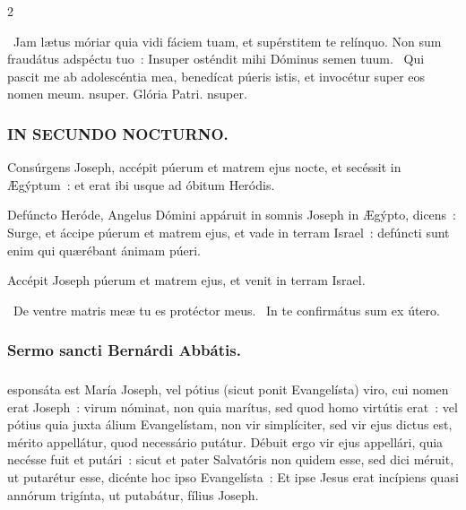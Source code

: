\documentclass[9pt,twoside]{extarticle}
\begin{document}
\begin{multicols}{2}
{\begin{tightlist}{}
\item {}~Jam lætus móriar quia vidi fáciem tuam, et supérstitem te relínquo. Non sum fraudátus adspéctu tuo~: \textred{*} Insuper osténdit mihi Dóminus semen tuum. ~Qui pascit me ab adolescéntia mea, benedícat púeris istis, et invocétur super eos nomen meum. nsuper. Glória Patri. nsuper.
\end{tightlist}

\subsubsection*{\center \textsc{IN SECUNDO NOCTURNO.}}
\begin{tightlist}{}
\item {} Consúrgens Joseph, accépit púerum et matrem ejus nocte, et secéssit in Ægýptum~: et erat ibi usque ad óbitum Heródis.
\item {} Defúncto Heróde, Angelus Dómini appáruit in somnis Joseph in Ægýpto, dicens~: Surge, et áccipe púerum et matrem ejus, et vade in terram Israel~: defúncti sunt enim qui quærébant ánimam púeri.
\item {} Accépit Joseph púerum et matrem ejus, et venit in terram Israel.
\item {}~De ventre matris meæ tu es protéctor meus. ~In te confirmátus sum ex útero.
\end{tightlist}

\subsubsection*{\center Sermo sancti Bernárdi Abbátis.}
\subsubsection*{\center {}}
esponsáta est María Joseph, vel pótius (sicut ponit Evangelísta) viro, cui nomen erat Joseph~: virum nóminat, non quia marítus, sed quod homo virtútis erat~: vel pótius quia juxta álium Evangelístam, non vir simplíciter, sed vir ejus dictus est, mérito appellátur, quod necessário putátur. Débuit ergo vir ejus appellári, quia necésse fuit et putári~: sicut et pater Salvatóris non quidem esse, sed dici méruit, ut putarétur esse, dicénte hoc ipso Evangelísta~: Et ipse Jesus erat incípiens quasi annórum trigínta, ut putabátur, fílius Joseph.

}
\end{multicols}
\end{document}
